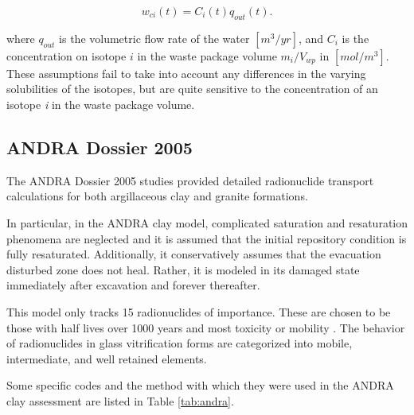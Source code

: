 \begin{equation}
  w_{ci}(t)=C_i(t)q_{out}(t). 
\end{equation}

where $q_{out}$ is the volumetric flow rate of the water $[m^3/yr]$, and 
$C_i$ is the concentration on isotope $i$ in the waste package volume 
$m_i/V_{wp}$ in $[mol/m^3]$. These assumptions fail to take into account any
differences in the varying solubilities of the isotopes, but are quite
sensitive to the concentration of an isotope \emph{i} in the waste package
volume.  

\subsection{ANDRA Dossier 2005} The ANDRA Dossier 2005 studies provided
detailed radionuclide transport calculations for both argillaceous clay and granite
formations. 

In particular, in the \gls{ANDRA} clay model, complicated saturation and 
resaturation phenomena are neglected and it is assumed that the initial 
repository condition is fully resaturated. Additionally, it conservatively 
assumes that the evacuation disturbed zone does not heal. Rather, it is modeled 
in its damaged state immediately after excavation and forever thereafter.

This model only tracks 15 radionuclides of importance.  These are chosen to be those
with half lives over 1000 years and most toxicity or mobility
\cite{andra_argile:_2005}. The behavior of radionuclides in 
glass vitrification forms are categorized into mobile,
intermediate, and well retained elements. 

Some specific codes and the method with which they were used in the \gls{ANDRA} 
clay assessment are listed in Table  \ref{tab:andra}.







